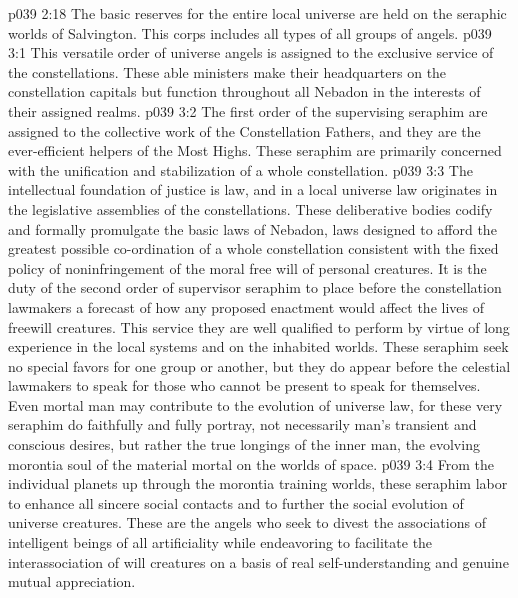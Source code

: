 \vs p039 2:18 \pc The basic reserves for the entire local universe are held on the seraphic worlds of Salvington. This corps includes all types of all groups of angels.
\vs p039 3:1 This versatile order of universe angels is assigned to the exclusive service of the constellations. These able ministers make their headquarters on the constellation capitals but function throughout all Nebadon in the interests of their assigned realms.
\vs p039 3:2 \pc {}\bibnobreakspace {} The first order of the supervising seraphim are assigned to the collective work of the Constellation Fathers, and they are the ever\hyp{}efficient helpers of the Most Highs. These seraphim are primarily concerned with the unification and stabilization of a whole constellation.
\vs p039 3:3 \pc {}\bibnobreakspace {} The intellectual foundation of justice is law, and in a local universe law originates in the legislative assemblies of the constellations. These deliberative bodies codify and formally promulgate the basic laws of Nebadon, laws designed to afford the greatest possible co\hyp{}ordination of a whole constellation consistent with the fixed policy of noninfringement of the moral free will of personal creatures. It is the duty of the second order of supervisor seraphim to place before the constellation lawmakers a forecast of how any proposed enactment would affect the lives of freewill creatures. This service they are well qualified to perform by virtue of long experience in the local systems and on the inhabited worlds. These seraphim seek no special favors for one group or another, but they do appear before the celestial lawmakers to speak for those who cannot be present to speak for themselves. Even mortal man may contribute to the evolution of universe law, for these very seraphim do faithfully and fully portray, not necessarily man’s transient and conscious desires, but rather the true longings of the inner man, the evolving morontia soul of the material mortal on the worlds of space.
\vs p039 3:4 \pc {}\bibnobreakspace {} From the individual planets up through the morontia training worlds, these seraphim labor to enhance all sincere social contacts and to further the social evolution of universe creatures. These are the angels who seek to divest the associations of intelligent beings of all artificiality while endeavoring to facilitate the interassociation of will creatures on a basis of real self\hyp{}understanding and genuine mutual appreciation.
